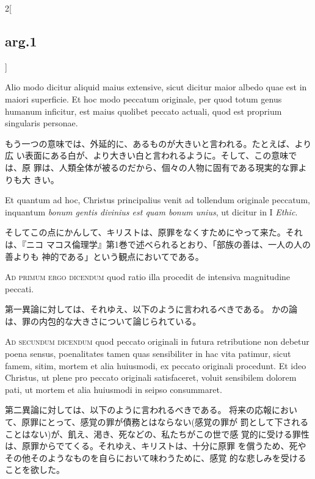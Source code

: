 \documentclass[paper=a4paper,fontsize=10pt,jafontsize=9pt,titlepage]{jlreq}
\begin{document}
\begin{paracol}{2}[\subsection{arg.1}]
\switchcolumn*

Alio modo dicitur aliquid maius extensive, sicut dicitur
maior albedo quae est in maiori superficie. Et hoc modo peccatum
originale, per quod totum genus humanum inficitur, est maius quolibet
peccato actuali, quod est proprium singularis personae.

\switchcolumn

もう一つの意味では、外延的に、あるものが大きいと言われる。たとえば、より広
い表面にある白が、より大きい白と言われるように。そして、この意味では、原
 罪は、人類全体が被るのだから、個々の人物に固有である現実的な罪よりも大
 きい。

\switchcolumn*

Et quantum ad
hoc, Christus principalius venit ad tollendum originale peccatum,
inquantum {\itshape bonum gentis divinius est quam bonum unius}, ut dicitur in I
{\itshape Ethic}.

\switchcolumn

そしてこの点にかんして、キリストは、原罪をなくすためにやって来た。それは、『ニコ
 マコス倫理学』第1巻で述べられるとおり、「部族の善は、一人の人の善よりも
 神的である」という観点においてである。

\switchcolumn*[\subsection{ad.1}]

{\scshape Ad primum ergo dicendum} quod ratio illa
procedit de intensiva magnitudine peccati.

\switchcolumn

第一異論に対しては、それゆえ、以下のように言われるべきである。
かの論は、罪の内包的な大きさについて論じられている。

\switchcolumn*[\subsection{ad.2}]

{\scshape Ad secundum dicendum} quod peccato originali
in futura retributione non debetur poena sensus, poenalitates tamen quas
sensibiliter in hac vita patimur, sicut famem, sitim, mortem et alia
huiusmodi, ex peccato originali procedunt. Et ideo Christus, ut plene
pro peccato originali satisfaceret, voluit sensibilem dolorem pati, ut
mortem et alia huiusmodi in seipso consummaret.

\switchcolumn

第二異論に対しては、以下のように言われるべきである。
将来の応報において、原罪にとって、感覚の罪が債務とはならない(感覚の罪が
 罰として下されることはない)が、飢え、渇き、死などの、私たちがこの世で感
 覚的に受ける罪性は、原罪からでてくる。それゆえ、キリストは、十分に原罪
 を償うため、死やその他そのようなものを自らにおいて味わうために、感覚
 的な悲しみを受けることを欲した。


\end{paracol}
\end{document}
